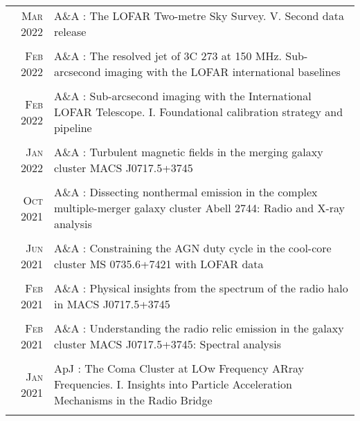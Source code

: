 \documentclass[11pt,a4paper,notitlepage]{article}
\begin{document}
\begin{tabular}{r|p{12.5cm}}

	\textsc{Mar 2022} & A\&A : The LOFAR Two-metre Sky Survey. V. Second data release \citep{2022AA...659A...1S} \\
	\multicolumn{2}{c}{} \\

	\textsc{Feb 2022} & A\&A : The resolved jet of 3C 273 at 150 MHz. Sub-arcsecond imaging with the LOFAR international baselines \citep{2022AA...658A...8H} \\
	\multicolumn{2}{c}{} \\

	\textsc{Feb 2022} & A\&A : Sub-arcsecond imaging with the International LOFAR Telescope. I. Foundational calibration strategy and pipeline \citep{2022AA...658A...1M} \\
	\multicolumn{2}{c}{} \\
	
	\textsc{Jan 2022} & A\&A : Turbulent magnetic fields in the merging galaxy cluster MACS J0717.5+3745 \citep{2022AA...657A...2R} \\
	\multicolumn{2}{c}{} \\

	\textsc{Oct 2021} & A\&A : Dissecting nonthermal emission in the complex multiple-merger galaxy cluster Abell 2744: Radio and X-ray analysis \citep{2021AA...654A..41R} \\
	\multicolumn{2}{c}{} \\
	
	\textsc{Jun 2021} & A\&A : Constraining the AGN duty cycle in the cool-core cluster MS 0735.6+7421 with LOFAR data
	 \citep{2021AA...650A.170B} \\
	\multicolumn{2}{c}{} \\


	\textsc{Feb 2021} & A\&A : Physical insights from the spectrum of the radio halo in MACS J0717.5+3745 \citep{2021AA...646A.135R} \\
	\multicolumn{2}{c}{} \\
	
	\textsc{Feb 2021} & A\&A : Understanding the radio relic emission in the galaxy cluster MACS J0717.5+3745: Spectral analysis \citep{2021AA...646A..56R} \\
	\multicolumn{2}{c}{} \\
	
	\textsc{Jan 2021} & ApJ : The Coma Cluster at LOw Frequency ARray Frequencies. I. Insights into Particle Acceleration Mechanisms in the Radio Bridge \citep{2021ApJ...907...32B} \\
	\multicolumn{2}{c}{} \\

\end{tabular}
\end{document}
